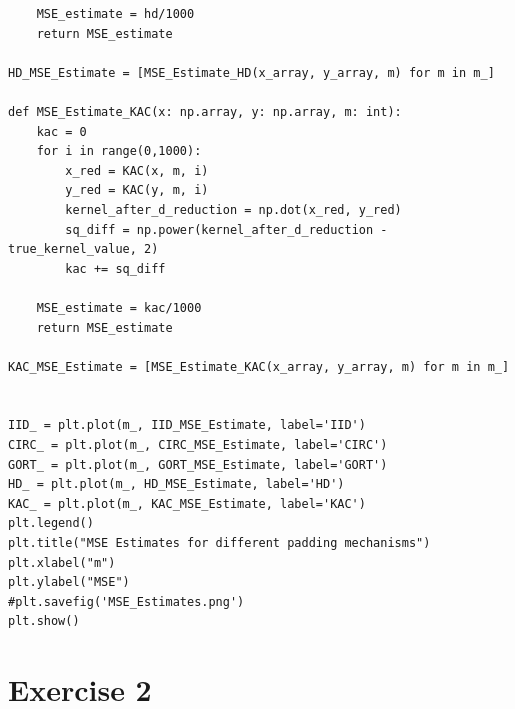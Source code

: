 \documentclass[11pt]{article}
\begin{document}
\begin{lstlisting}
    MSE_estimate = hd/1000
    return MSE_estimate

HD_MSE_Estimate = [MSE_Estimate_HD(x_array, y_array, m) for m in m_]

def MSE_Estimate_KAC(x: np.array, y: np.array, m: int):
    kac = 0
    for i in range(0,1000):
        x_red = KAC(x, m, i)
        y_red = KAC(y, m, i)
        kernel_after_d_reduction = np.dot(x_red, y_red)
        sq_diff = np.power(kernel_after_d_reduction - true_kernel_value, 2)
        kac += sq_diff
        
    MSE_estimate = kac/1000
    return MSE_estimate

KAC_MSE_Estimate = [MSE_Estimate_KAC(x_array, y_array, m) for m in m_]


IID_ = plt.plot(m_, IID_MSE_Estimate, label='IID')
CIRC_ = plt.plot(m_, CIRC_MSE_Estimate, label='CIRC')
GORT_ = plt.plot(m_, GORT_MSE_Estimate, label='GORT')
HD_ = plt.plot(m_, HD_MSE_Estimate, label='HD')
KAC_ = plt.plot(m_, KAC_MSE_Estimate, label='KAC')
plt.legend()
plt.title("MSE Estimates for different padding mechanisms")
plt.xlabel("m")
plt.ylabel("MSE")
#plt.savefig('MSE_Estimates.png')
plt.show()
\end{lstlisting}

\section*{Exercise 2}
\end{document}
